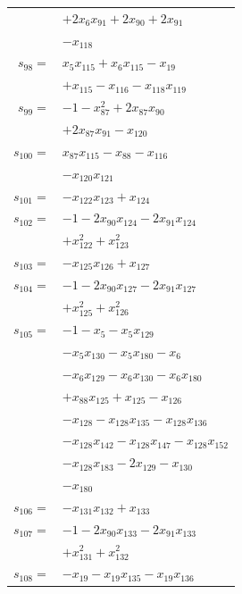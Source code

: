 \begin{longtable}{@{}r@{\;}l@{}}
 & \(\displaystyle +2x_{6}x_{91} +2x_{90} +2x_{91}\) \\
 & \(\displaystyle -x_{118}\) \\[3pt]
\(s_{98}=\) & \(\displaystyle x_{5}x_{115} +x_{6}x_{115} -x_{19}\) \\
 & \(\displaystyle +x_{115} -x_{116} -x_{118}x_{119}\) \\[3pt]
\(s_{99}=\) & \(\displaystyle -1 -x_{87}^{2} +2x_{87}x_{90}\) \\
 & \(\displaystyle +2x_{87}x_{91} -x_{120}\) \\[3pt]
\(s_{100}=\) & \(\displaystyle x_{87}x_{115} -x_{88} -x_{116}\) \\
 & \(\displaystyle -x_{120}x_{121}\) \\[3pt]
\(s_{101}=\) & \(\displaystyle -x_{122}x_{123} +x_{124}\) \\[3pt]
\(s_{102}=\) & \(\displaystyle -1 -2x_{90}x_{124} -2x_{91}x_{124}\) \\
 & \(\displaystyle +x_{122}^{2} +x_{123}^{2}\) \\[3pt]
\(s_{103}=\) & \(\displaystyle -x_{125}x_{126} +x_{127}\) \\[3pt]
\(s_{104}=\) & \(\displaystyle -1 -2x_{90}x_{127} -2x_{91}x_{127}\) \\
 & \(\displaystyle +x_{125}^{2} +x_{126}^{2}\) \\[3pt]
\(s_{105}=\) & \(\displaystyle -1 -x_{5} -x_{5}x_{129}\) \\
 & \(\displaystyle -x_{5}x_{130} -x_{5}x_{180} -x_{6}\) \\
 & \(\displaystyle -x_{6}x_{129} -x_{6}x_{130} -x_{6}x_{180}\) \\
 & \(\displaystyle +x_{88}x_{125} +x_{125} -x_{126}\) \\
 & \(\displaystyle -x_{128} -x_{128}x_{135} -x_{128}x_{136}\) \\
 & \(\displaystyle -x_{128}x_{142} -x_{128}x_{147} -x_{128}x_{152}\) \\
 & \(\displaystyle -x_{128}x_{183} -2x_{129} -x_{130}\) \\
 & \(\displaystyle -x_{180}\) \\[3pt]
\(s_{106}=\) & \(\displaystyle -x_{131}x_{132} +x_{133}\) \\[3pt]
\(s_{107}=\) & \(\displaystyle -1 -2x_{90}x_{133} -2x_{91}x_{133}\) \\
 & \(\displaystyle +x_{131}^{2} +x_{132}^{2}\) \\[3pt]
\(s_{108}=\) & \(\displaystyle -x_{19} -x_{19}x_{135} -x_{19}x_{136}\) \\

\end{longtable}
